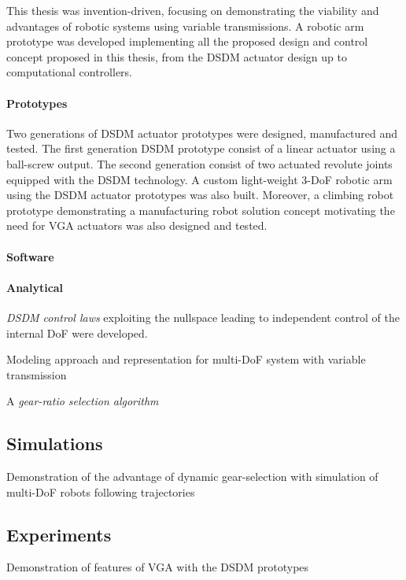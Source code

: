 This thesis was invention-driven, focusing on demonstrating the viability and advantages of robotic systems using variable transmissions. A robotic arm prototype was developed implementing all the proposed design and control concept proposed in this thesis, from the DSDM actuator design up to computational controllers. 

\paragraph{Prototypes}
%
Two generations of DSDM actuator prototypes were designed, manufactured and tested. The first generation DSDM prototype consist of a linear actuator using a ball-screw output. The second generation consist of two actuated revolute joints equipped with the DSDM technology. A custom light-weight 3-DoF robotic arm using the DSDM actuator prototypes was also built. Moreover, a climbing robot prototype demonstrating a manufacturing robot solution concept motivating the need for VGA actuators was also designed and tested.

\paragraph{Software}
%



\paragraph{Analytical}

\emph{DSDM control laws} exploiting the nullspace leading to independent control of the internal DoF were developed. 

Modeling approach and representation for multi-DoF system with variable transmission

A \emph{gear-ratio selection algorithm}

\subsection{Simulations}

Demonstration of the advantage of dynamic gear-selection with simulation of multi-DoF robots following trajectories 


\subsection{Experiments}

Demonstration of features of VGA with the DSDM prototypes

